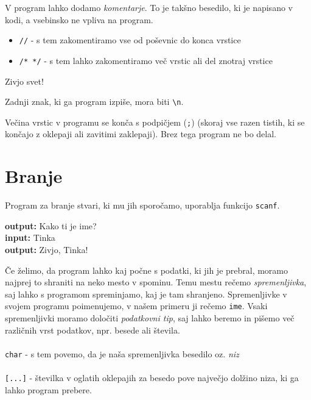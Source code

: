 \documentclass{book}
\begin{document}
\newpage
\noindent V program lahko dodamo \emph{komentarje}. To je takšno besedilo, ki je napisano v kodi, a vsebinsko ne vpliva na program.
\begin{itemize}
	\item \verb+//+ - s tem zakomentiramo vse od poševnic do konca vrstice
	\item \verb+/* */+ - s tem lahko zakomentiramo več vrstic ali del znotraj vrstice
\end{itemize}

\begin{examples}


\begin{inout}
\tcblower
Zivjo svet!
\end{inout}

\end{examples}

\begin{errors}
Zadnji znak, ki ga program izpiše, mora biti \verb+\n+.
\end{errors}

\begin{errors}
Večina vrstic v programu se konča s podpičjem (\verb+;+) (skoraj vse razen tistih, ki se končajo z oklepaji  ali zavitimi zaklepaji). Brez tega program ne bo delal.
\end{errors}

\newpage
\section{Branje}
Program za branje stvari, ki mu jih sporočamo, uporablja funkcijo \verb+scanf+.

\begin{examples}


\begin{inout}
{\color{blue} \bf output:} Kako ti je ime?\\
{\color{blue} \bf input:} Tinka \\
{\color{blue} \bf output:} Zivjo, Tinka!
\end{inout}

\end{examples}


Če želimo, da program lahko kaj počne s podatki, ki jih je prebral, moramo najprej to shraniti na neko mesto v spominu. Temu mestu rečemo \emph{spremenljivka}, saj lahko s programom spreminjamo, kaj je tam shranjeno. Spremenljivke v svojem programu poimenujemo, v našem primeru ji rečemo \verb+ime+. Vsaki spremenljivki moramo določiti \emph{podatkovni tip}, saj lahko beremo in pišemo več različnih vrst podatkov, npr. besede ali števila. \\\\
\verb+char+ - s tem povemo, da je naša spremenljivka besedilo oz. \emph{niz} \\\\
\verb+[...]+ - številka v oglatih oklepajih za besedo pove največjo dolžino niza, ki ga lahko program prebere.
\end{document}
